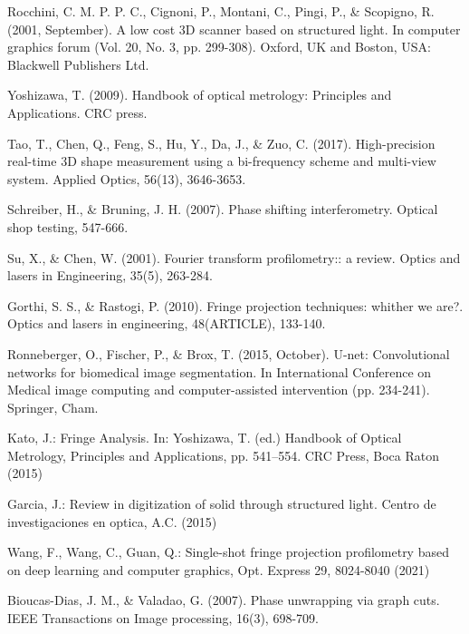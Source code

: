 \documentclass[10pt,letterpaper]{article}
\begin{document}
\begin{thebibliography}{0}
Rocchini, C. M. P. P. C., Cignoni, P., Montani, C., Pingi, P., \& Scopigno, R. (2001, September). A low cost 3D scanner based on structured light. In computer graphics forum (Vol. 20, No. 3, pp. 299-308). Oxford, UK and Boston, USA: Blackwell Publishers Ltd.

Yoshizawa, T. (2009). Handbook of optical metrology: Principles and Applications. CRC press.

Tao, T., Chen, Q., Feng, S., Hu, Y., Da, J., \& Zuo, C. (2017). High-precision real-time 3D shape measurement using a bi-frequency scheme and multi-view system. Applied Optics, 56(13), 3646-3653.

Schreiber, H., \& Bruning, J. H. (2007). Phase shifting interferometry. Optical shop testing, 547-666.

Su, X., \& Chen, W. (2001). Fourier transform profilometry:: a review. Optics and lasers in Engineering, 35(5), 263-284.

Gorthi, S. S., \& Rastogi, P. (2010). Fringe projection techniques: whither we are?. Optics and lasers in engineering, 48(ARTICLE), 133-140.













Ronneberger, O., Fischer, P., \& Brox, T. (2015, October). U-net: Convolutional networks for biomedical image segmentation. In International Conference on Medical image computing and computer-assisted intervention (pp. 234-241). Springer, Cham.

Kato, J.: Fringe Analysis. In: Yoshizawa, T. (ed.) Handbook of Optical Metrology, Principles and Applications, pp. 541–554. CRC Press, Boca Raton (2015)

Garcia, J.: Review in digitization of solid through structured light. Centro de investigaciones en optica, A.C. (2015)

Wang, F., Wang, C., Guan, Q.: Single-shot fringe projection profilometry based on deep learning and computer graphics, Opt. Express 29, 8024-8040 (2021)

Bioucas-Dias, J. M., \& Valadao, G. (2007). Phase unwrapping via graph cuts. IEEE Transactions on Image processing, 16(3), 698-709.


\end{thebibliography}
\end{document}
